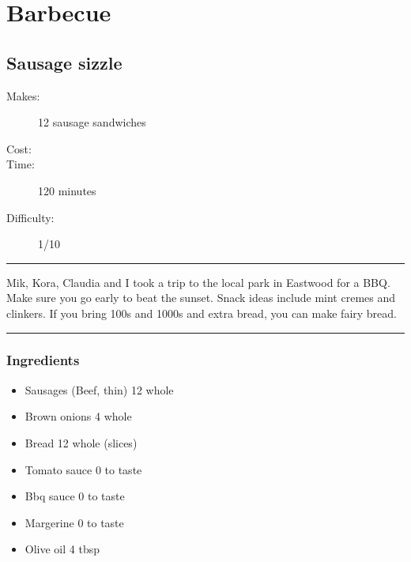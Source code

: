 \documentclass[]{article}
\begin{document}
\section*{\center\Huge\color{accent}Barbecue}
\label{cat:Barbecue}
\label{rec:Sausage sizzle}
\subsection*{\center\huge Sausage sizzle}
\begin{description}
\item[Makes:] 12 sausage sandwiches
\item[Cost:] \textdollar
\item[Time:] 120 minutes
\item[Difficulty:] 1/10
\end{description}
\vspace{0.2cm}\hrule\vspace{0.5cm}
\begin{adjustwidth}{0.5 cm}{0.5 cm}

Mik, Kora, Claudia and I took a trip to the local park in Eastwood for a BBQ. Make sure you go early to beat the sunset. Snack ideas include mint cremes and clinkers. If you bring 100s and 1000s and extra bread, you can make fairy bread. \hfill{}\color{black}

\end{adjustwidth}
\vspace{0.5cm}\hrule
\subsubsection*{\Large Ingredients}
\begin{multicols}{2}
\begin{itemize}
 \item Sausages (Beef, thin) \hfill 12 whole
 \item Brown onions \hfill 4 whole
 \item Bread \hfill 12 whole (slices)
 \item Tomato sauce \hfill 0 to taste
 \item Bbq sauce \hfill 0 to taste
 \item Margerine \hfill 0 to taste
 \item Olive oil \hfill 4 tbsp
\end{itemize}
\end{multicols}
\end{document}
